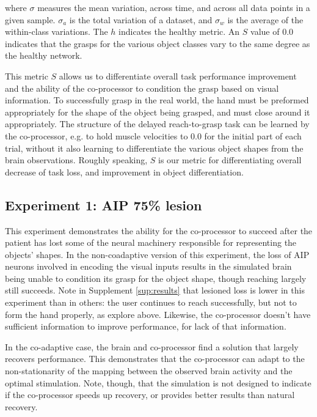 \documentclass[12pt]{iopart}
\begin{document}
where $\sigma$ measures the mean variation, across time, and across all data points in
a given sample. $\sigma_{a}$ is the total variation of a dataset, and $\sigma_{w}$
is the average of the within-class variations. The $h$ indicates the healthy
metric. An $S$ value of 0.0 indicates that the grasps for the various object classes
vary to the same degree as the healthy network.

This metric $S$ allows us to differentiate overall task performance improvement
and the ability of the co-processor to condition the grasp based on visual information.
To successfully grasp in the real world, the hand must be preformed appropriately for
the shape of the object being grasped, and must close around it appropriately.
The structure of the delayed reach-to-grasp task can be learned by the co-processor,
e.g. to hold muscle velocities to 0.0 for the initial part of each trial, without it
also learning to differentiate the various object shapes from the brain observations.
Roughly speaking, $S$ is our metric for differentiating overall decrease of task loss,
and improvement in object differentiation.

\subsection{Experiment 1: AIP 75\% lesion}
This experiment demonstrates the ability for the co-processor to succeed after the
patient has lost some of the neural machinery responsible for representing the objects' shapes.
In the non-coadaptive version of this experiment, the loss of AIP neurons involved
in encoding the visual inputs results in the simulated brain being unable to
condition its grasp for the object shape, though reaching largely still succeeds.
Note in Supplement \ref{sup:results} that lesioned loss is lower in this experiment than
in others: the user continues to reach successfully, but not to form the hand properly, as
explore above. Likewise, the co-processor doesn't have sufficient information to improve
performance, for lack of that information.

In the co-adaptive case, the brain and co-processor find a solution that largely recovers
performance. This demonstrates that the co-processor can adapt to the non-stationarity
of the mapping between the observed brain activity and the optimal stimulation. Note,
though, that the simulation is not designed to indicate if the co-processor speeds up
recovery, or provides better results than natural recovery.
\end{document}
